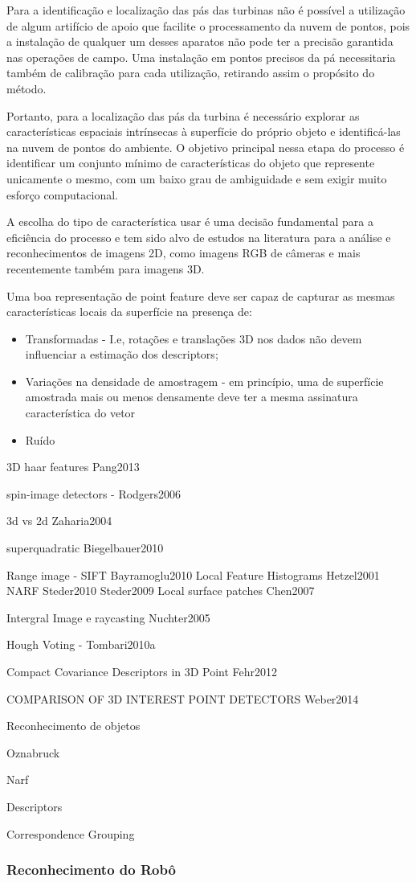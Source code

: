 Para a identificação e localização das pás das turbinas não é possível a
utilização de algum artifício de apoio que facilite o processamento da nuvem de
pontos, pois a instalação de qualquer um desses aparatos não pode ter a precisão
garantida nas operações de campo. Uma instalação em pontos precisos
da pá necessitaria também de calibração para cada utilização, retirando assim
o propósito do método. 

Portanto, para a localização das pás da turbina é
necessário explorar as características espaciais intrínsecas à superfície do
próprio objeto e identificá-las na nuvem de pontos do ambiente. O objetivo
principal nessa etapa do processo é identificar um conjunto mínimo de
características do objeto que represente unicamente o mesmo, com um baixo grau
de ambiguidade e sem exigir muito esforço computacional. 

A escolha do tipo de característica usar é uma decisão fundamental para a
eficiência do processo e tem sido alvo de estudos na literatura para a análise
e reconhecimentos de imagens 2D, como imagens RGB de câmeras e mais recentemente
também para imagens 3D. 

Uma boa representação de point feature deve ser capaz de capturar as mesmas
características locais da superfície na presença de:

\begin{itemize}
  \item Transformadas -  I.e, rotações e translações 3D nos dados não devem influenciar a estimação dos descriptors;
  \item Variações na densidade de amostragem - em princípio, uma de superfície
  amostrada mais ou menos densamente deve ter a mesma assinatura característica do vetor
  \item Ruído
\end{itemize}

3D haar features Pang2013

spin-image detectors - Rodgers2006

3d vs 2d Zaharia2004

superquadratic Biegelbauer2010

Range image - SIFT Bayramoglu2010
			  Local Feature Histograms  Hetzel2001
			  NARF Steder2010 Steder2009
			  Local surface patches Chen2007
			  
Intergral Image e raycasting Nuchter2005

Hough Voting - Tombari2010a
			  
			  

Compact Covariance Descriptors in 3D Point  Fehr2012

COMPARISON OF 3D INTEREST POINT DETECTORS  Weber2014




Reconhecimento de objetos

Oznabruck

Narf

Descriptors

Correspondence Grouping




\subsubsection{Reconhecimento do Robô}